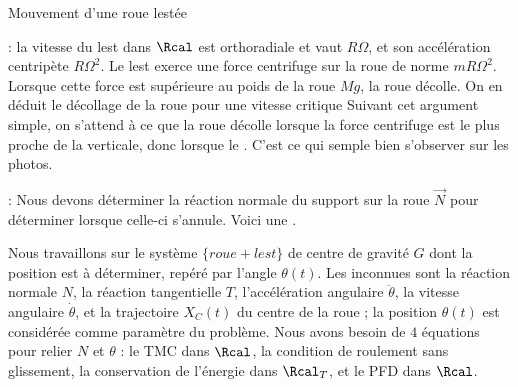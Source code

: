 \begin{exo}[PC][3][oral]{Mouvement d'une roue lestée}
{\begin{liste}
\begin{liste}
      \item {} : la vitesse du lest dans $\Rcal$ est orthoradiale et vaut $R \Omega$, et son accélération centripète $R\Omega^2$. Le lest exerce une force centrifuge sur la roue de norme $mR\Omega^2$. Lorsque cette force est supérieure au poids de la roue $Mg$, la roue décolle. On en déduit le décollage de la roue pour une vitesse critique 
      Suivant cet argument simple, on s'attend à ce que la roue décolle lorsque la force centrifuge est le plus proche de la verticale, donc lorsque le . C'est ce qui semple bien s'observer sur les photos.
      \item {} : Nous devons déterminer la réaction normale du support sur la roue $\Vec{N}$ pour déterminer lorsque celle-ci s'annule. Voici une . 
      
      Nous travaillons sur le système $\{roue + lest\}$ de centre de gravité $G$ dont la position est à déterminer, repéré par l'angle $\theta(t)$. Les inconnues sont la réaction normale $N$, la réaction tangentielle $T$, l'accélération angulaire $\ddot{\theta}$, la vitesse angulaire $\dot{\theta}$, et la trajectoire $X_C(t)$ du centre de la roue ; la position $\theta(t)$ est considérée comme paramètre du problème. Nous avons besoin de $4$ équations pour relier $N$ et $\theta$ : le TMC dans $\Rcal$, la condition de roulement sans glissement, la conservation de l'énergie dans $\Rcal_T$, et le PFD dans $\Rcal$.
    \end{liste}
   \end{liste}

}
\end{exo}


